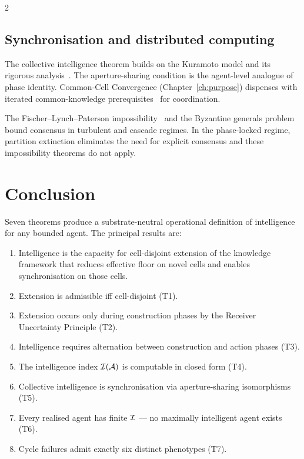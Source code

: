 \begin{multicols}{2}
\subsection{Synchronisation and distributed computing}

The collective intelligence theorem builds on the Kuramoto model and its rigorous
analysis~\citep{kuramoto1984,strogatz2000,acebron2005,pikovsky2001}. The
aperture-sharing condition is the agent-level analogue of phase identity. Common-Cell
Convergence (Chapter~\ref{ch:purpose}) dispenses with iterated common-knowledge
prerequisites~\citep{aumann1976,fagin1995,lewis1969} for coordination.

The Fischer--Lynch--Paterson impossibility~\citep{fischer1985} and the Byzantine
generals problem~\citep{lamport1982} bound consensus in turbulent and cascade regimes.
In the phase-locked regime, partition extinction eliminates the need for explicit
consensus and these impossibility theorems do not apply.

\section{Conclusion}
\label{sec:ch05-conclusion}

Seven theorems produce a substrate-neutral operational definition of intelligence for
any bounded agent. The principal results are:

\begin{enumerate}
\item Intelligence is the capacity for cell-disjoint extension of the knowledge framework
  that reduces effective floor on novel cells and enables synchronisation on those cells.
\item Extension is admissible iff cell-disjoint (T1).
\item Extension occurs only during construction phases by the Receiver Uncertainty
  Principle (T2).
\item Intelligence requires alternation between construction and action phases (T3).
\item The intelligence index $\mathcal{I}(\mathcal{A})$ is computable in closed form (T4).
\item Collective intelligence is synchronisation via aperture-sharing isomorphisms (T5).
\item Every realised agent has finite $\mathcal{I}$ --- no maximally intelligent agent exists (T6).
\item Cycle failures admit exactly six distinct phenotypes (T7).
\end{enumerate}


\end{multicols}
